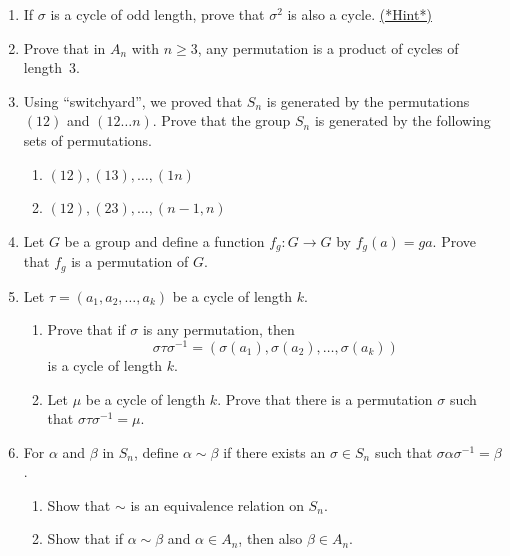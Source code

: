 \begin{enumerate}
\item \label{ex:permute:Ad4}
If $\sigma$ is a cycle of odd length, prove that $\sigma^2$ is also a
cycle.
\hyperref[sec:permute:hints]{(*Hint*)}  
  
\item
Prove that in $A_n$ with $n \geq 3$, any permutation is a product of
cycles of length~3.  
  
\item
Using ``switchyard'', we proved that $S_n$ is generated by the permutations $(12)$ and $(12 \ldots n)$.
Prove that the group $S_n$ is generated by
the following sets of permutations.
\begin{enumerate}
 
 \item
$(1 2), (13), \ldots, (1n)$
 
 \item
$(1 2), (23), \ldots, (n- 1,n)$
 
 
\end{enumerate}
 
 
\item
Let $G$ be a group and define a function $f_g : G \rightarrow G$ by
$f_g(a) = g a$.  Prove that $f_g$ is a permutation of $G$.
 
 
 \item
Let $\tau = (a_1, a_2, \ldots, a_k)$ be a cycle of length $k$.
\begin{enumerate}
 
 \item
Prove that if $\sigma$ is any permutation, then
\[
\sigma \tau \sigma^{-1 } = ( \sigma(a_1), \sigma(a_2), \ldots,
\sigma(a_k))
\]
is a cycle of length $k$.
 
 \item
Let $\mu$ be a cycle of length $k$. Prove that there is a permutation
$\sigma$ such that $\sigma \tau \sigma^{-1 } = \mu$.
 
\end{enumerate}
 
 
\item
For $\alpha$ and $\beta$ in $S_n$, define $\alpha \sim \beta$ if there
exists an $\sigma \in S_n$ such that $\sigma \alpha \sigma^{-1} =
\beta$.  
\begin{enumerate}
\item
Show that $\sim$ is an equivalence relation on $S_n$.
 \item
Show that if $\alpha \sim \beta$ and $\alpha \in A_n$, then also $\beta \in A_n$.
 \end{enumerate}


\end{enumerate}
